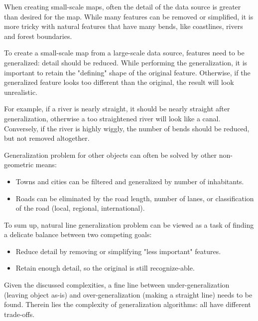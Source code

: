\documentclass[a4paper]{article}
\begin{document}

When creating small-scale maps, often the detail of the data source is greater
than desired for the map. While many features can be removed or simplified, it
is more tricky with natural features that have many bends, like coastlines,
rivers and forest boundaries.

To create a small-scale map from a large-scale data source, features need to be
generalized: detail should be reduced. While performing the generalization, it
is important to retain the "defining" shape of the original feature. Otherwise,
if the generalized feature looks too different than the original, the result
will look unrealistic.

For example, if a river is nearly straight, it should be nearly straight after
generalization, otherwise a too straightened river will look like a canal.
Conversely, if the river is highly wiggly, the number of bends should be
reduced, but not removed altogether.

Generalization problem for other objects can often be solved by other
non-geometric means:

\begin{itemize}
    \item Towns and cities can be filtered and generalized by number of
        inhabitants.
    \item Roads can be eliminated by the road length, number of lanes, or
        classification of the road (local, regional, international).
\end{itemize}

To sum up, natural line generalization problem can be viewed as a task of
finding a delicate balance between two competing goals:

\begin{itemize}
    \item Reduce detail by removing or simplifying "less important" features.
    \item Retain enough detail, so the original is still recognize-able.
\end{itemize}

Given the discussed complexities, a fine line between under-generalization
(leaving object as-is) and over-generalization (making a straight line) needs
to be found. Therein lies the complexity of generalization algorithms: all have
different trade-offs.
\end{document}
